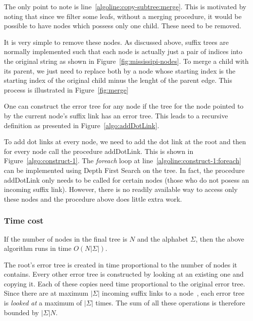 The only point to note is line~\ref{algoline:copy-subtree:merge}. This is motivated by noting that since we filter some leafs, without a merging procedure, it would be possible to have nodes which possess only one child. These need to be removed.

It is very simple to remove these nodes. As discussed above, suffix trees are normally implemented such that each node is actually just a pair of indices into the original string as shown in Figure~\ref{fig:mississipi-nodes}. To merge a child with its parent, we just need to replace both by a node whose starting index is the starting index of the original child minus the lenght of the parent edge. This process is illustrated in Figure~\ref{fig:merge} 



One can construct the error tree for any node if the tree for the node pointed to by the current node's suffix link has an error tree. This leads to a recursive definition as presented in Figure~\ref{algo:addDotLink}. 



To add dot links at every node, we need to add the dot link at the root and then for every node call the procedure addDotLink. This is shown in Figure~\ref{algo:construct-1}. The \textit{foreach} loop at line~\ref{algoline:construct-1:foreach} can be implemented using Depth First Search on the tree. In fact, the procedure addDotLink only needs to be called for certain nodes (those who do not posess an incoming suffix link). However, there is no readily available way to access only these nodes and the procedure above does little extra work.

\subsubsection{Time cost}

If the number of nodes in the final tree is $N$ and the alphabet $\Sigma$, then the above algorithm runs in time $O(N|\Sigma|)$.

The root's error tree is created in time proportional to the number of nodes it contains. Every other error tree is constructed by looking at an existing one and copying it. Each of these copies need time proportional to the original error tree. Since there are at maximum $|\Sigma|$ incoming suffix links to a node~\cite{}, each error tree is \emph{looked at} a maximum of $|\Sigma|$ times. The sum of all these operations is therefore bounded by $|\Sigma|N$.

